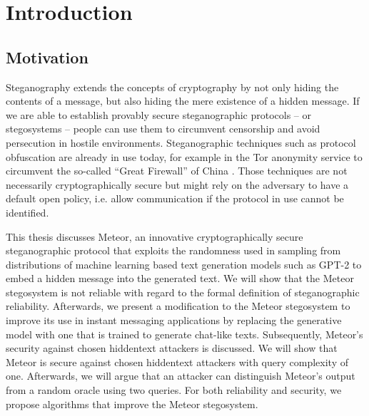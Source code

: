\chapter{Introduction}

\section{Motivation}


Steganography extends the concepts of cryptography by not only hiding the contents of a message, but also hiding the mere existence of a hidden message.
If we are able to establish provably secure steganographic protocols -- or stegosystems -- people can use them to circumvent censorship and avoid persecution in hostile environments.
Steganographic techniques such as protocol obfuscation are already in use today, for example in the Tor anonymity service to circumvent the so-called ``Great Firewall'' of China \cite{TorBlocking2012}.
Those techniques are not necessarily cryptographically secure but might rely on the adversary to have a default open policy, i.e. allow communication if the protocol in use cannot be identified.

This thesis discusses Meteor, an innovative cryptographically secure steganographic protocol that exploits the randomness used in sampling from distributions of machine learning based text generation models such as GPT-2 to embed a hidden message into the generated text.
We will show that the Meteor stegosystem is not reliable with regard to the formal definition of steganographic reliability.
Afterwards, we present a modification to the Meteor stegosystem to improve its use in instant messaging applications by replacing the generative model with one that is trained to generate chat-like texts.
Subsequently, Meteor's security against chosen hiddentext attackers is discussed.
We will show that Meteor is secure against chosen hiddentext attackers with query complexity of one.
Afterwards, we will argue that an attacker can distinguish Meteor's output from a random oracle using two queries.
For both reliability and security, we propose algorithms that improve the Meteor stegosystem.


